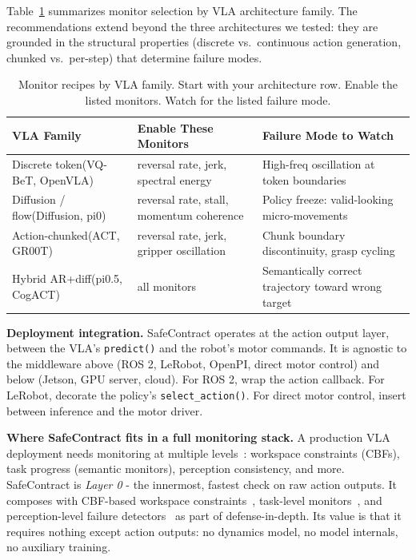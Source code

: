 \documentclass[conference]{IEEEtran}
\begin{document}
Table~\ref{tab:recipe} summarizes monitor selection by VLA architecture family.
The recommendations extend beyond the three architectures we tested: they are grounded in the structural properties (discrete vs.\ continuous action generation, chunked vs.\ per-step) that determine failure modes.

\begin{table}[t]
\centering
\caption{Monitor recipes by VLA family. Start with your architecture row. Enable the listed monitors. Watch for the listed failure mode.}
\label{tab:recipe}
\small
\begin{tabular}{p{1.4cm}p{2.9cm}p{2.9cm}}
\toprule
\textbf{VLA Family} & \textbf{Enable These Monitors} & \textbf{Failure Mode to Watch} \\
\midrule
Discrete token\newline\scriptsize{(VQ-BeT, OpenVLA)} & reversal rate, jerk, spectral energy & High-freq oscillation at token boundaries \\
\midrule
Diffusion / flow\newline\scriptsize{(Diffusion, pi0)} & reversal rate, stall, momentum coherence & Policy freeze: valid-looking micro-movements \\
\midrule
Action-chunked\newline\scriptsize{(ACT, GR00T)} & reversal rate, jerk, gripper oscillation & Chunk boundary discontinuity, grasp cycling \\
\midrule
Hybrid AR+diff\newline\scriptsize{(pi0.5, CogACT)} & all monitors & Semantically correct trajectory toward wrong target \\
\bottomrule
\end{tabular}
\end{table}

\textbf{Deployment integration.}
SafeContract operates at the action output layer, between the VLA's \texttt{predict()} and the robot's motor commands.
It is agnostic to the middleware above (ROS 2, LeRobot, OpenPI, direct motor control) and below (Jetson, GPU server, cloud).
For ROS 2, wrap the action callback.
For LeRobot, decorate the policy's \texttt{select\_action()}.
For direct motor control, insert between inference and the motor driver.

\textbf{Where SafeContract fits in a full monitoring stack.}
A production VLA deployment needs monitoring at multiple levels~\cite{kim2026guardrails}: workspace constraints (CBFs), task progress (semantic monitors), perception consistency, and more.
SafeContract is \emph{Layer 0} - the innermost, fastest check on raw action outputs.
It composes with CBF-based workspace constraints~\cite{aegis}, task-level monitors~\cite{sentinel}, and perception-level failure detectors~\cite{fiper2025} as part of defense-in-depth.
Its value is that it requires nothing except action outputs: no dynamics model, no model internals, no auxiliary training.
\end{document}

